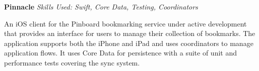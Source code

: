 \textbf{Pinnacle}  \newline
\textit{Skills Used: Swift, Core Data, Testing, Coordinators}

An iOS client for the Pinboard bookmarking service under active development that
provides an interface for users to manage their collection of bookmarks. The
application supports both the iPhone and iPad and uses coordinators to manage
application flows. It uses Core Data for persistence with a suite of unit and
performance tests covering the sync system.

